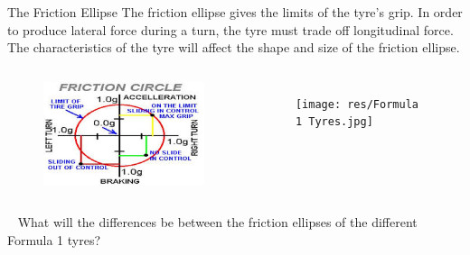 \begin{frame}{The Friction Ellipse}
    The friction ellipse gives the limits of the tyre's grip.
    In order to produce lateral force during a turn,
    the tyre must trade off longitudinal force.
    The characteristics of the tyre
    will affect the shape and size of the friction ellipse.
    \begin{columns}
        \begin{figure}
            \includegraphics[width=\textwidth]{res/Tyre Friction Ellipse.jpg}
        \end{figure}
        \begin{figure}
            \texttt{[image: res/Formula 1 Tyres.jpg]}
        \end{figure}
    \end{columns}
    \begin{block}{~}
        What will the differences be between
        the friction ellipses of the different Formula 1 tyres?
    \end{block}
\end{frame}

